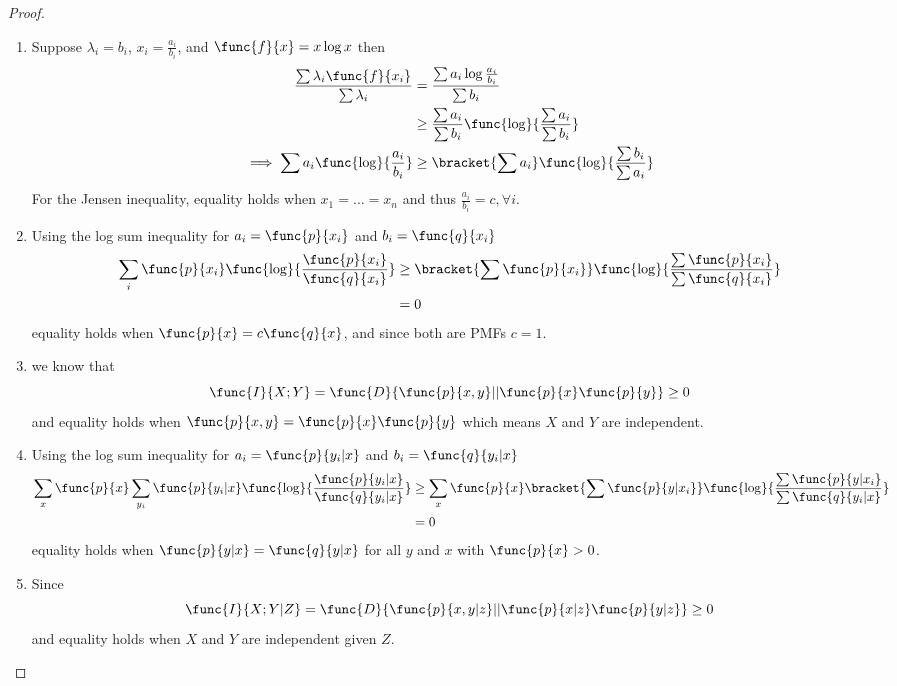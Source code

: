  \begin{proof}
       \begin{enumerate}
            \item Suppose \(\lambda_i = b_i\), \(x_i = \frac{a_i}{b_i}\), and \(\func{f}{x} = x \log x\) then 
            \begin{align*}
                  \dfrac{\sum \lambda_i \func{f}{x_i}}{\sum \lambda_i} &= \dfrac{\sum a_i \log \frac{a_i}{b_i}}{\sum b_i}\\
                  &\geq \dfrac{\sum a_i}{\sum b_i}\func{\log}{\dfrac{\sum a_i}{\sum b_i}} \\
                  \implies \sum a_i \func{\log}{\dfrac{a_i}{b_i}} &\geq \bracket{\sum a_i} \func{\log}{\dfrac{\sum b_i}{\sum a_i}}
            \end{align*}
            For the Jensen inequality, equality holds when \(x_1 = \dots = x_n\) and thus \(\frac{a_i}{b_i} = c, \forall i\).
            \item Using the log sum inequality for \(a_i = \func{p}{x_i}\) and \(b_i = \func{q}{x_i}\) 
            \begin{align*}
                  \sum_i \func{p}{x_i} \func{\log}{\dfrac{\func{p}{x_i}}{\func{q}{x_i}}} &\geq \bracket{\sum \func{p}{x_i}}\func{\log}{\dfrac{\sum \func{p}{x_i}}{\sum \func{q}{x_i}}}\\
                  &= 0
            \end{align*}
            equality holds when \(\func{p}{x} = c \func{q}{x}\), and since both are PMFs \(c = 1\).
            \item we know that
            \begin{equation*}
                  \func{I}{X;Y} = \func{D}{\func{p}{x,y} || \func{p}{x} \func{p}{y}} \geq 0
            \end{equation*}
            and equality holds when \(\func{p}{x,y} = \func{p}{x} \func{p}{y}\) which means \(X\) and \(Y\) are independent.
            \item Using the log sum inequality for \(a_i = \func{p}{y_i |x}\) and \(b_i = \func{q}{y_i|x}\) 
            \begin{align*}
                  \sum_x \func{p}{x} \sum_{y_i} \func{p}{y_i | x} \func{\log}{\dfrac{\func{p}{y_i | x}}{\func{q}{y_i | x}}} &\geq \sum_x \func{p}{x}\bracket{\sum \func{p}{y|x_i}}\func{\log}{\dfrac{\sum \func{p}{y|x_i}}{\sum \func{q}{y_i | x}}}\\
                  &= 0
            \end{align*}
            equality holds when \(\func{p}{y|x} =\func{q}{y|x}\) for all \(y\) and \(x\) with \(\func{p}{x} > 0\).
            \item Since 
            \begin{equation*}
                  \func{I}{X;Y | Z} = \func{D}{\func{p}{x,y|z} || \func{p}{x|z} \func{p}{y|z}} \geq 0
            \end{equation*}
            and equality holds when \(X\) and \(Y\) are independent given \(Z\).
       \end{enumerate}
 \end{proof}

